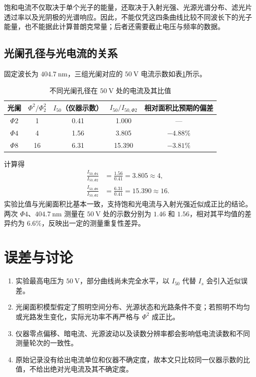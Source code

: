 \documentclass[12pt,a4paper]{ctexart}
\begin{document}
饱和电流不仅取决于单个光子的能量，还取决于入射光强、光源光谱分布、滤光片透过率以及光阴极的光谱响应。因此，不能仅凭这四条曲线比较不同波长下的光子能量，也不能据此计算普朗克常量；后者还需要截止电压与频率的数据。

\subsection{光阑孔径与光电流的关系}
固定波长为 $404.7\ \mathrm{nm}$，三组光阑对应的 $50\ \mathrm{V}$ 电流示数如表\ref{tab:aperture}所示。

\begin{table}[H]
  \centering
  \caption{不同光阑孔径在 $50\ \mathrm{V}$ 处的电流及其比值}
  \label{tab:aperture}
  \begin{tabular}{ccccc}
    \toprule
    光阑 & $\Phi^2/\Phi_2^2$ & $I_{50}$（仪器示数） & $I_{50}/I_{50,\Phi2}$ & 相对面积比预期的偏差 \\
    \midrule
    $\Phi2$ & 1  & 0.41 & 1.000  & --- \\
    $\Phi4$ & 4  & 1.56 & 3.805  & $-4.88\%$ \\
    $\Phi8$ & 16 & 6.31 & 15.390 & $-3.81\%$ \\
    \bottomrule
  \end{tabular}
\end{table}

计算得
\begin{align}
  \frac{I_{50,\Phi4}}{I_{50,\Phi2}}&=\frac{1.56}{0.41}=3.805\approx4,\\
  \frac{I_{50,\Phi8}}{I_{50,\Phi2}}&=\frac{6.31}{0.41}=15.390\approx16.
\end{align}
实验比值与光阑面积比基本一致，支持饱和光电流与入射光强近似成正比的结论。两次 $\Phi4$、$404.7\ \mathrm{nm}$ 测量在 $50\ \mathrm{V}$ 处的示数分别为 $1.46$ 和 $1.56$，相对其平均值的差异约为 $6.6\%$，反映出一定的测量重复性差异。

\section{误差与讨论}
\begin{enumerate}
  \item 实验最高电压为 $50\ \mathrm{V}$，部分曲线尚未完全水平，以 $I_{50}$ 代替 $I_s$ 会引入近似误差。
  \item 光阑面积模型假定了照明空间分布、光源状态和光路条件不变；若照明不均匀或光路发生变化，实际光功率不再严格与 $\Phi^2$ 成正比。
  \item 仪器零点偏移、暗电流、光源波动以及读数分辨率都会影响低电流读数和不同测量轮次的一致性。
  \item 原始记录没有给出电流单位和仪器不确定度，故本文只比较同一仪器示数的比值，不给出绝对光电流及其不确定度。
\end{enumerate}
\end{document}
